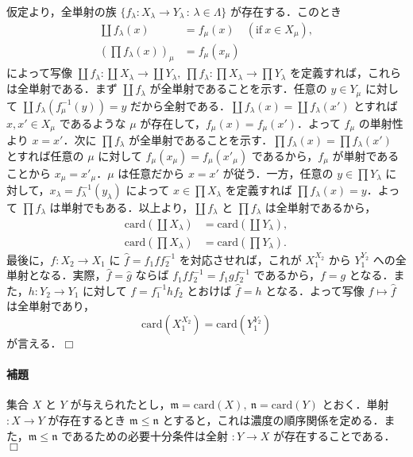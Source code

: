 \documentclass[10pt,b5paper,pandoc]{bxjsarticle}
\let\oldparagraph\paragraph
\renewcommand{\paragraph}[1]{\oldparagraph{#1}\mbox{}}
\begin{document}
仮定より，全単射の族
\(\{ f_\lambda \colon X_\lambda \to Y_\lambda \,:\,\lambda \in \Lambda \}\)
が存在する．このとき \begin{align*}
\coprod f_\lambda (x) &= f_{\mu}(x) \quad (\text{if}\ x \in X_\mu),\\
\left(\prod f_\lambda (x)\right)_\mu &= f_\mu (x_\mu)
\end{align*} によって写像
\(\coprod f_\lambda \colon \coprod X_\lambda \to \coprod Y_\lambda,\ \prod f_\lambda \colon \prod X_\lambda \to \prod Y_\lambda\)
を定義すれば，これらは全単射である．まず \(\coprod f_\lambda\)
が全単射であることを示す．任意の \(y \in Y_\mu\) に対して
\(\coprod f_\lambda(f_\mu^{-1}(y)) = y\)
だから全射である．\(\coprod f_\lambda (x) = \coprod f_\lambda (x')\)
とすれば \(x, x' \in X_\mu\) であるような \(\mu\)
が存在して，\(f_\mu (x) = f_\mu (x')\)．よって \(f_\mu\) の単射性より
\(x = x'\)．次に \(\prod f_\lambda\)
が全単射であることを示す．\(\prod f_\lambda (x) = \prod f_\lambda (x')\)
とすれば任意の \(\mu\) に対して \(f_\mu(x_\mu) = f_\mu (x'_\mu)\)
であるから，\(f_\mu\) が単射であることから \(x_\mu = x'_\mu\)．\(\mu\)
は任意だから \(x = x'\) が従う．一方，任意の \(y \in \prod Y_\lambda\)
に対して，\(x_\lambda = f_\lambda^{-1}(y_\lambda)\) によって
\(x \in \prod X_\lambda\) を定義すれば
\(\prod f_\lambda (x) = y\)．よって \(\prod f_\lambda\)
は単射でもある．以上より，\(\coprod f_\lambda\) と \(\prod f_\lambda\)
は全単射であるから， \begin{align*}
\mathrm{card}(\coprod X_\lambda) &= \mathrm{card}(\coprod Y_\lambda),\\
\mathrm{card}(\prod X_\lambda) &= \mathrm{card}(\prod Y_\lambda).
\end{align*} 最後に，\(f \colon X_2 \to X_1\) に
\(\hat f = f_1ff_2^{-1}\) を対応させれば，これが \(X_1^{X_2}\) から
\(Y_1^{Y_2}\) への全単射となる．実際，\(\hat f = \hat g\) ならば
\(f_1ff_2^{-1} = f_1gf_2^{-1}\) であるから，\(f = g\)
となる．また，\(h \colon Y_2 \to Y_1\) に対して \(f = f_1^{-1}hf_2\)
とおけば \(\hat f = h\) となる．よって写像 \(f \mapsto \hat f\)
は全単射であり， \[
\mathrm{card}(X_1^{X_2}) = \mathrm{card}(Y_1^{Y_2})
\] が言える．\(\Box\)

\hypertarget{ux88dcux984c-1}{%
\paragraph{補題}\label{ux88dcux984c-1}}

集合 \(X\) と \(Y\)
が与えられたとし，\(\mathfrak m = \mathrm{card}(X),\ \mathfrak n = \mathrm{card}(Y)\)
とおく．単射 \(\colon X \to Y\) が存在するとき
\(\mathfrak m \leqslant\mathfrak n\)
とすると，これは濃度の順序関係を定める．また，\(\mathfrak m \leqslant\mathfrak n\)
であるための必要十分条件は全射 \(\colon Y \to X\)
が存在することである．\(\Box\)
\end{document}
